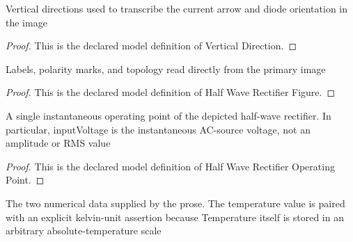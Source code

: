 \begin{definition}
  \label{def:physics:phyx-mini-0629:phyxminiproblems-problemphyxmini0629-verticaldirection}
  Vertical directions used to transcribe the current arrow and diode orientation in the image
\end{definition}
\begin{proof}
  This is the declared model definition of Vertical Direction.
\end{proof}
\begin{definition}
  \label{def:physics:phyx-mini-0629:phyxminiproblems-problemphyxmini0629-halfwaverectifierfigure}
  Labels, polarity marks, and topology read directly from the primary image
\end{definition}
\begin{proof}
  This is the declared model definition of Half Wave Rectifier Figure.
\end{proof}
\begin{definition}
  \label{def:physics:phyx-mini-0629:phyxminiproblems-problemphyxmini0629-halfwaverectifieroperatingpoint}
  A single instantaneous operating point of the depicted half-wave rectifier. In particular, inputVoltage is the instantaneous AC-source voltage, not an amplitude or RMS value
\end{definition}
\begin{proof}
  This is the declared model definition of Half Wave Rectifier Operating Point.
\end{proof}
\begin{definition}
  \label{def:physics:phyx-mini-0629:phyxminiproblems-problemphyxmini0629-matchesstatedrectifierdata}
  The two numerical data supplied by the prose. The temperature value is paired with an explicit kelvin-unit assertion because Temperature itself is stored in an arbitrary absolute-temperature scale
\end{definition}

